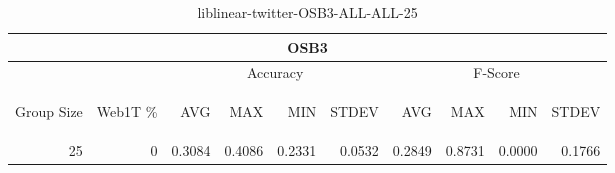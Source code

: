 \begin{center}
\begin{table}[htbp] 
 \begin{center}
\begin{tabular}{ | r | r | r | r | r | r | r | r | r | r |}
\hline
\multicolumn{10}{|c|}{OSB3}\\
\hline
 & & \multicolumn{4}{|c|}{Accuracy} & \multicolumn{4}{|c|}{F-Score}\\ \cline{3-10}
\begin{sideways}Group Size\end{sideways} & \begin{sideways}Web1T \%\end{sideways} & \begin{sideways}AVG\end{sideways} & \begin{sideways}MAX\end{sideways} & \begin{sideways}MIN\end{sideways} & \begin{sideways}STDEV\end{sideways} & \begin{sideways}AVG\end{sideways} & \begin{sideways}MAX\end{sideways} & \begin{sideways}MIN\end{sideways} & \begin{sideways}STDEV\end{sideways}\\
\hline
\multirow{0}{*}{25}
 & 0 & 0.3084 & 0.4086 & 0.2331 & 0.0532 & 0.2849 & 0.8731 & 0.0000 & 0.1766\\ \cline{2-10}
\hline
\end{tabular}
\caption{liblinear-twitter-OSB3-ALL-ALL-25}
\label{table:liblinear-twitter-OSB3-ALL-ALL-25}
\end{center}
 \end{table}
\end{center}

